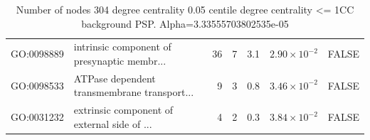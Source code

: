 \begin{table}[ht]
\begin{adjustbox}{max width=\textwidth}
\begin{tabular}{llrrrrl}
  GO:0098889 & intrinsic component of presynaptic membr... & 36 & 7 & 3.1 & $2.90 \times 10^{-2}$ & FALSE \\ 
  GO:0098533 & ATPase dependent transmembrane transport... & 9 & 3 & 0.8 & $3.46 \times 10^{-2}$ & FALSE \\ 
  GO:0031232 & extrinsic component of external side of ... & 4 & 2 & 0.3 & $3.84 \times 10^{-2}$ & FALSE \\ 
   \hline
\end{tabular}
\end{adjustbox}
\caption{Number of nodes 304 degree centrality 0.05 centile  degree centrality <= 1CC background PSP. Alpha=3.33555703802535e-05} 
\label{tab:Number of nodes 304 degree centrality 0.05 centile  degree centrality <= 1CC background PSP. Alpha=3.33555703802535e-05}
\end{table}


